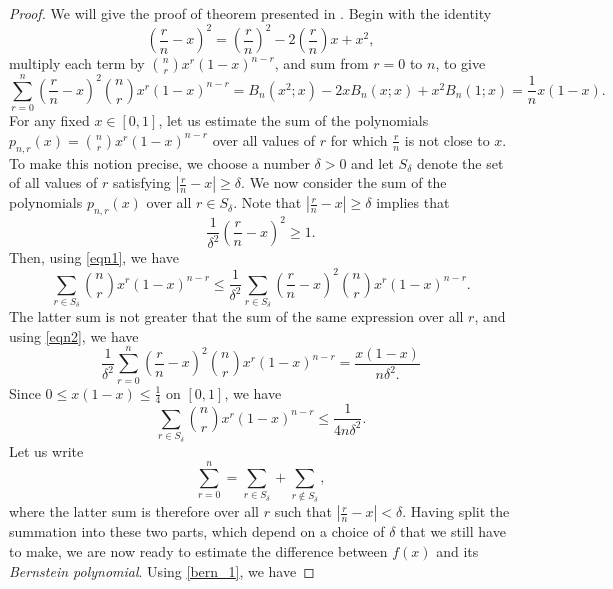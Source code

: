 \documentclass[12pt]{article}
\begin{document}
\begin{proof}
   We will give the proof of theorem presented in \cite{phillips2003interpolation}. Begin with the identity
   \begin{equation*}
       \left(\frac{r}{n}-x\right)^2 = \left(\frac{r}{n}\right)^2 - 2\left(\frac{r}{n}\right)x + x^2,
   \end{equation*}
   multiply each term by $\binom{n}{r}x^r(1-x)^{n-r}$, and sum from $r=0$ to $n$, to give
   \begin{equation}
   \label{eqn2}
       \sum_{r=0}^n\left(\frac{r}{n}-x\right)^2\binom{n}{r}x^r(1-x)^{n-r} = B_n(x^2;x) - 2xB_n(x;x) + x^2B_n(1;x)=\frac{1}{n}x(1-x).
   \end{equation}
   For any fixed $x \in [0, 1]$, let us estimate the sum of the polynomials $p_{n, r}(x) = \binom{n}{r}x^r(1-x)^{n-r}$ over all values of $r$ for which $\frac{r}{n}$ is not close to $x$. To make this notion precise, we choose a number $\delta > 0$ and let $S_{\delta}$ denote the set of all values of $r$ satisfying $|\frac{r}{n}-x| \geq \delta$. We now consider the sum of the polynomials $p_{n, r}(x)$ over all $r \in S_\delta.$ Note that $|\frac{r}{n}-x|\geq\delta$ implies that
   \begin{equation}
   \label{eqn1}
       \frac{1}{\delta^2}\left(\frac{r}{n}-x\right)^2\geq1.
   \end{equation}
   Then, using \eqref{eqn1}, we have 
   \begin{equation*}
       \sum_{r \in S_\delta}\binom{n}{r}x^r(1-x)^{n-r}\leq\frac{1}{\delta^2}\sum_{r\in S_\delta}\left(\frac{r}{n}-x\right)^2\binom{n}{r}x^r(1-x)^{n-r}.
   \end{equation*}
   The latter sum is not greater that the sum of the same expression over all $r$, and using \eqref{eqn2}, we have 
   \begin{equation*}
       \frac{1}{\delta^2}\sum_{r=0}^n\left(\frac{r}{n}-x\right)^2\binom{n}{r}x^r(1-x)^{n-r} = \frac{x(1-x)}{n\delta^2.}
   \end{equation*}
   Since $0\leq x(1-x) \leq \frac{1}{4}$ on $[0, 1]$, we have
   \begin{equation}
       \sum_{r \in S_\delta}\binom{n}{r}x^r(1-x)^{n-r} \leq \frac{1}{4n\delta^2}.
       \label{eqn4}
   \end{equation}
   Let us write
   \begin{equation*}
       \sum_{r=0}^n = \sum_{r \in S_\delta} + \sum_{r\notin S_\delta},
   \end{equation*}
   where the latter sum is therefore over all $r$ such that $|\frac{r}{n}-x| < \delta$. Having split the summation into these two parts, which depend on a choice of $\delta$ that we still have to make, we are now ready to estimate the difference between $f(x)$ and its \textit{Bernstein polynomial}. Using \eqref{bern_1}, we have

\end{proof}
\end{document}
